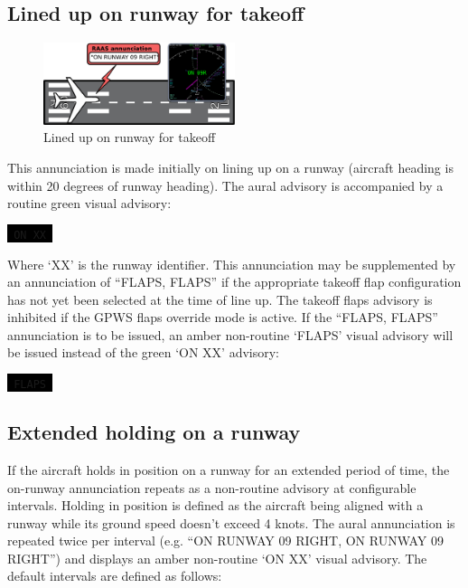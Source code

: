 \documentclass[a4paper,12pt]{article}
\newcommand{\visualadvisory}[3][b]{%
    \ifthenelse{\equal{#1}{b}}{\begin{center}}{}
    \noindent
    \colorbox{black}{\textcolor{#2visualadvisorycolor}{\large\texttt{~#3~}}}
    \ifthenelse{\equal{#1}{b}}{\end{center}}{}}
\begin{document}
\newpage

\subsection{Lined up on runway for takeoff}
\label{subsec:OnRwyMon}

\begin{figure}
\begin{center}
\includegraphics[width=0.5\textwidth]{../src/on_rwy.pdf}
\end{center}
\caption{Lined up on runway for takeoff}
\end{figure}

This annunciation is made initially on lining up on a runway (aircraft
heading is within 20 degrees of runway heading).  The aural advisory is
accompanied by a routine green visual advisory:

\visualadvisory{routine}{ON XX}

\noindent Where `XX' is the runway identifier. This annunciation may be
supplemented by an annunciation of ``FLAPS, FLAPS'' if the appropriate
takeoff flap configuration has not yet been selected at the time of line
up. The takeoff flaps advisory is inhibited if the GPWS flaps override
mode is active. If the ``FLAPS, FLAPS'' annunciation is to be issued, an
amber non-routine `FLAPS' visual advisory will be issued instead of the
green `ON XX' advisory:

\visualadvisory{nonroutine}{FLAPS}

\subsection{Extended holding on a runway}
\label{subsec:ExtHoldingMon}

If the aircraft holds in position on a runway for an extended period of
time, the on-runway annunciation repeats as a non-routine advisory at
configurable intervals. Holding in position is defined as the aircraft
being aligned with a runway while its ground speed doesn't exceed 4
knots. The aural annunciation is repeated twice per interval (e.g. ``ON
RUNWAY 09 RIGHT, ON RUNWAY 09 RIGHT'') and displays an amber non-routine
`ON XX' visual advisory. The default intervals are defined as follows:
\end{document}
